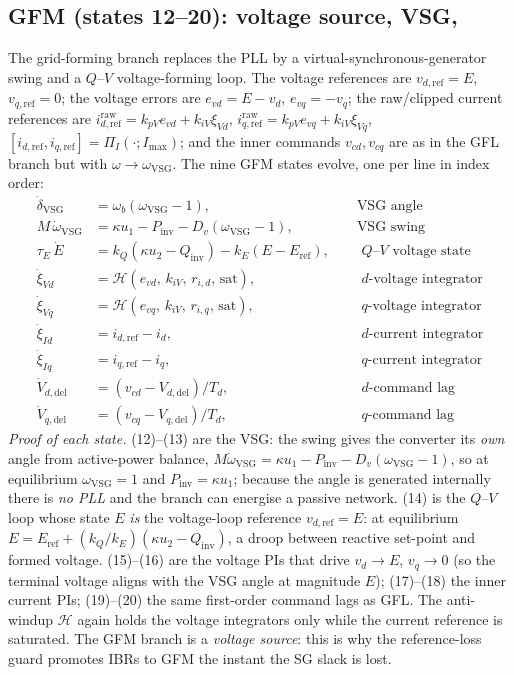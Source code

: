 \documentclass[12pt,a4paper]{article}
\begin{document}
\subsection{GFM (states 12--20): voltage source, VSG, }
The grid-forming branch replaces the PLL by a virtual-synchronous-generator swing
and a $Q$--$V$ voltage-forming loop. The voltage references are
$v_{d,\mathrm{ref}}=E$, $v_{q,\mathrm{ref}}=0$; the voltage errors are
$e_{vd}=E-v_d$, $e_{vq}=-v_q$; the raw/clipped current references are
$i_{d,\mathrm{ref}}^{\mathrm{raw}}=k_{pV}e_{vd}+k_{iV}\xi_{Vd}$,
$i_{q,\mathrm{ref}}^{\mathrm{raw}}=k_{pV}e_{vq}+k_{iV}\xi_{Vq}$,
$[i_{d,\mathrm{ref}},i_{q,\mathrm{ref}}]=\Pi_I(\cdot;I_{\max})$; and the inner
commands $v_{cd},v_{cq}$ are as in the GFL branch but with $\omega\to\omega_{\mathrm{VSG}}$.
The nine GFM states evolve, one per line in index order:
\begin{align}
  \dot{\delta}_{\mathrm{VSG}} &= \omega_b(\omega_{\mathrm{VSG}}-1), &&\text{ VSG angle}\\
  M\,\dot{\omega}_{\mathrm{VSG}} &= \kappa u_1-P_{\mathrm{inv}}-D_v(\omega_{\mathrm{VSG}}-1),
     &&\text{ VSG swing}\\
  \tau_E\,\dot{E} &= k_Q(\kappa u_2-Q_{\mathrm{inv}})-k_E(E-E_{\mathrm{ref}}),
     &&\text{ $Q$--$V$ voltage state}\\
  \dot{\xi}_{Vd} &= \mathcal{H}(e_{vd},\,k_{iV},\,r_{i,d},\,\text{sat}),
     &&\text{ $d$-voltage integrator}\\
  \dot{\xi}_{Vq} &= \mathcal{H}(e_{vq},\,k_{iV},\,r_{i,q},\,\text{sat}),
     &&\text{ $q$-voltage integrator}\\
  \dot{\xi}_{Id} &= i_{d,\mathrm{ref}}-i_d, &&\text{ $d$-current integrator}\\
  \dot{\xi}_{Iq} &= i_{q,\mathrm{ref}}-i_q, &&\text{ $q$-current integrator}\\
  \dot{V}_{d,\mathrm{del}} &= (v_{cd}-V_{d,\mathrm{del}})/T_d, &&\text{ $d$-command lag}\\
  \dot{V}_{q,\mathrm{del}} &= (v_{cq}-V_{q,\mathrm{del}})/T_d, &&\text{ $q$-command lag}
\end{align}
\emph{Proof of each state.} (12)--(13) are the VSG: the swing gives the converter
its \emph{own} angle from active-power balance, $M\dot\omega_{\mathrm{VSG}}
=\kappa u_1-P_{\mathrm{inv}}-D_v(\omega_{\mathrm{VSG}}-1)$, so at equilibrium
$\omega_{\mathrm{VSG}}=1$ and $P_{\mathrm{inv}}=\kappa u_1$; because the angle is
generated internally there is \emph{no PLL} and the branch can energise a passive
network. (14) is the $Q$--$V$ loop whose state $E$ \emph{is} the voltage-loop
reference $v_{d,\mathrm{ref}}=E$: at equilibrium $E=E_{\mathrm{ref}}
+(k_Q/k_E)(\kappa u_2-Q_{\mathrm{inv}})$, a droop between reactive set-point and
formed voltage. (15)--(16) are the voltage PIs that drive $v_d\to E$, $v_q\to 0$
(so the terminal voltage aligns with the VSG angle at magnitude $E$); (17)--(18)
the inner current PIs; (19)--(20) the same first-order command lags as GFL. The
anti-windup $\mathcal H$ again holds the voltage integrators only while the
current reference is saturated. The GFM branch is a \emph{voltage source}: this is
why the reference-loss guard promotes IBRs to GFM the instant the SG slack is
lost.
\end{document}
